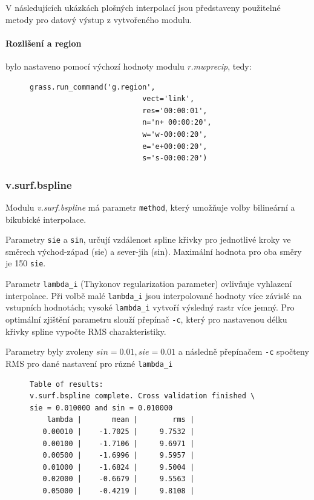 \documentclass[a4paper,12pt,oneside]{report}
\begin{document}
V následujících ukázkách plošných interpolací jsou představeny použitelné  metody pro datový výstup z vytvořeného modulu.

\paragraph*{Rozlišení a region} bylo nastaveno pomocí výchozí hodnoty modulu \textit{r.mwprecip}, tedy:
\begin{figure}[h!]
\begin{footnotesize}
\lstset{extendedchars=false,
escapeinside=''}
\begin{lstlisting}[style=mybash]
        grass.run_command('g.region',
                          vect='link',
                          res='00:00:01',
                          n='n+ 00:00:20',
                          w='w-00:00:20',
                          e='e+00:00:20',
                          s='s-00:00:20')
\end{lstlisting}
\end{footnotesize} 
\end{figure}



\subsubsection*{v.surf.bspline}
Modulu \textit{v.surf.bspline} má parametr \texttt{method}, který umožňuje volby bilineární a bikubické interpolace.

\begin{description}
\item Parametry \texttt{sie} a \texttt{sin}, určují vzdálenost spline křivky pro jednotlivé kroky ve směrech východ-západ (sie) a sever-jih (sin). Maximální hodnota pro oba směry je 150 \texttt{sie}. 
\item Parametr \texttt{lambda\_i} (Thykonov regularization parameter) ovlivňuje vyhlazení interpolace. Při volbě malé \texttt{lambda\_i} jsou interpolované hodnoty více závislé na vstupních hodnotách; vysoké \texttt{lambda\_i} vytvoří výsledný rastr více jemný. Pro optimální zjištění parametru slouží přepínač \texttt{-c}, který pro nastavenou délku křivky spline vypočte RMS charakteristiky.
\end{description}


Parametry byly zvoleny $sin=0.01, sie=0.01$ a následně přepínačem \texttt{-c} spočteny RMS pro dané nastavení pro různé \texttt{lambda\_i} 
\begin{figure}[h!]
\begin{footnotesize}
\lstset{extendedchars=false,
escapeinside=''}
\begin{lstlisting}[style=mybash]
Table of results:
v.surf.bspline complete. Cross validation finished \
sie = 0.010000 and sin = 0.010000
    lambda |       mean |        rms |
   0.00010 |    -1.7025 |     9.7532 |
   0.00100 |    -1.7106 |     9.6971 |
   0.00500 |    -1.6996 |     9.5957 |
   0.01000 |    -1.6824 |     9.5004 |
   0.02000 |    -0.6679 |     9.5563 |
   0.05000 |    -0.4219 |     9.8108 |
\end{lstlisting}
\end{footnotesize} 
\end{figure}
\end{document}
